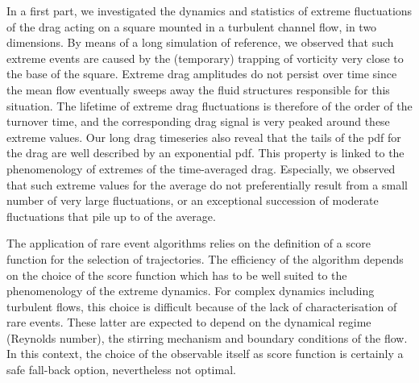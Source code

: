 \documentclass{jfm}
\newcommand{\EL}[1]{{\color{myred}{#1}}}
\begin{document}

In a first part, we investigated the dynamics and statistics of extreme fluctuations of the drag acting on a square mounted in a turbulent channel flow, in two dimensions.
By means of a long simulation of reference, we observed that such extreme events are caused by the (temporary) trapping of vorticity very close to the base of the square.
Extreme drag amplitudes do not persist over time since the mean flow eventually sweeps away the fluid structures responsible for this situation.
%
The lifetime of extreme drag fluctuations is therefore of the order of the turnover time, and the corresponding drag signal is very peaked around these extreme values.
Our long drag timeseries also reveal that the tails of the \ac{pdf} for the drag are well described by an exponential \ac{pdf}.
This property is linked to the phenomenology of extremes of the time-averaged drag.
Especially, we observed that such extreme values for the average do not preferentially result from a small number of very large fluctuations, or an exceptional succession of moderate fluctuations that pile up to \EL{yield a large value} of the average.

The application of rare event algorithms relies on the definition of a score function for the selection of trajectories.
The efficiency of the algorithm depends on the choice of the score function which has to be well suited to the phenomenology of the extreme dynamics.
For complex dynamics including turbulent flows, this choice is  difficult because of the lack of characterisation of rare events. These latter are expected to depend on the dynamical regime (Reynolds number), the stirring mechanism and boundary conditions of the flow. In this context, the choice of the observable itself as score function is certainly a safe fall-back option, nevertheless not optimal.
\end{document}
